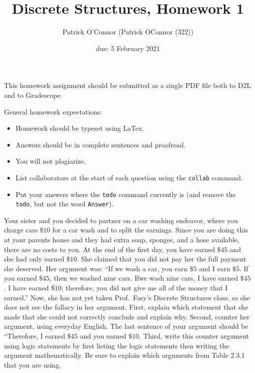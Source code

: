 \documentclass{article}
\title{Discrete Structures, Homework 1}
\author{Patrick O'Connor (Patrick OConnor (322))}
\date{due: 5 February 2021}
\begin{document}
\maketitle

This homework assignment should be
submitted as a single PDF file both to D2L and to Gradescope.

General homework expectations:
\begin{itemize}
    \item Homework should be typeset using LaTex.
    \item Answers should be in complete sentences and proofread.
    \item You will not plagiarize.  \item List collaborators at the start of
    each question using the \texttt{collab} command.
    \item Put your answers where the \texttt{todo} command currently is (and
        remove the \texttt{todo}, but not the word \texttt{Answer}).
\end{itemize}

 
Your sister and you decided to partner on a car washing endeavor, where you
charge cars $\$10$ for a car wash and to split the earnings.  Since you are
doing this at your parents house and they had extra soap, sponges, and a hose
available, there are no costs to you.  At the end of the first day, you have
earned $\$45$ and she had only earned $\$10$. She claimed that you did not pay
her the full payment she deserved. Her argument was: ``If we wash a car, you
earn $\$5$ and I earn $\$5$.  If you earned $\$45$, then we washed nine cars.
Ifwe wash nine cars, I have earned $\$45$.  I have earned $\$10$; therefore, you
did not give me all of the money that I earned.''  Now, she has not yet taken
Prof.~Fasy's Discrete Structures class, so she does not see the fallacy in her
argument. First, explain which statement that she made that she could not
correctly conclude and explain why.  Second, counter her argument, using
everyday English. The last sentence of your argument should be ``Therefore, I
earned $\$45$ and you earned $\$10$. Third, write this counter argument using
logic statements by first listing the logic statements then writing the argument
mathematically.  Be sure to explain which arguments from Table 2.3.1 that you
are using.
\end{document}
